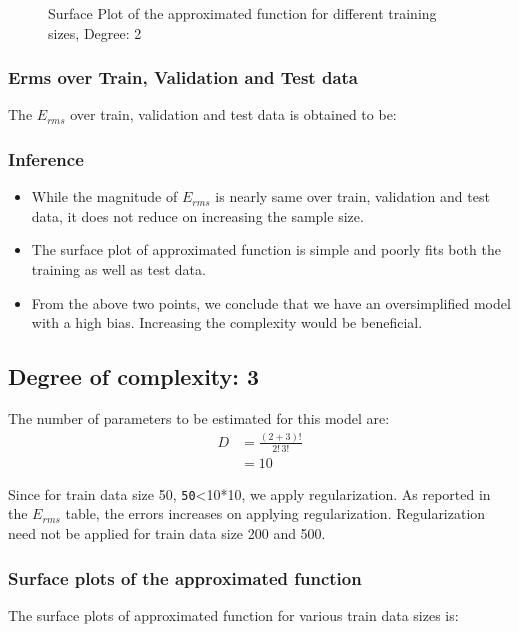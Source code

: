 \documentclass[12pt,a4paper]{article}
\newcommand{\noi}{\noindent}
\def\tt#1{\texttt{#1}}
\begin{document}
\begin{figure}[H]
    \caption{Surface Plot of the approximated function for different training sizes, Degree: 2}
    \label{fig:sp_d2}
\end{figure}

\subsubsection{Erms over Train, Validation and Test data}
The $E_{rms}$ over train, validation and test data is obtained to be: 


\subsubsection{Inference}
\begin{itemize}
    \itemsep0em
    \item While the magnitude of $E_{rms}$ is nearly same over train, validation and test data, it does not reduce on increasing the sample size. 
    \item The surface plot of approximated function is simple and poorly fits both the training as well as test data.
    \item From the above two points, we conclude that we have an oversimplified model with a high bias. Increasing the complexity would be beneficial.
\end{itemize}

\subsection{Degree of complexity: 3}
The number of parameters to be estimated for this model are: 
\begin{equation}
    \begin{split}
        D&=\frac{(2+3)!}{2!\,3!} \\
         &=10
    \end{split}
\end{equation}

\noi
Since for train data size 50, \tt{50}<10*10, we apply regularization. As reported in the $E_{rms}$ table, the errors increases on applying regularization. Regularization need not be applied for train data size 200 and 500. 

\subsubsection{Surface plots of the approximated function}
The surface plots of approximated function for various train data sizes is: 
\end{document}
